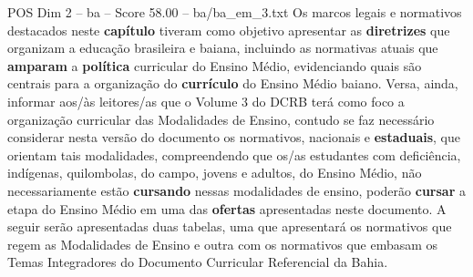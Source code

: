 \begin{textsample}{POS Dim 2 – ba – Score 58.00 – ba/ba\_em\_3.txt}
Os marcos legais e normativos destacados neste \textbf{capítulo} tiveram como objetivo apresentar as \textbf{diretrizes} que organizam a educação brasileira e baiana, incluindo as normativas atuais que \textbf{amparam} a \textbf{política} curricular do Ensino Médio, evidenciando quais são centrais para a organização do \textbf{currículo} do Ensino Médio baiano.
Versa, ainda, informar aos/às leitores/as que o Volume 3 do DCRB terá como foco a organização curricular das Modalidades de Ensino, contudo se faz necessário considerar nesta versão do documento os normativos, nacionais e \textbf{estaduais}, que orientam tais modalidades, compreendendo que os/as estudantes com deficiência, indígenas, quilombolas, do campo, jovens e adultos, do Ensino Médio, não necessariamente estão \textbf{cursando} nessas modalidades de ensino, poderão \textbf{cursar} a etapa do Ensino Médio em uma das \textbf{ofertas} apresentadas neste documento.
A seguir serão apresentadas duas tabelas, uma que apresentará os normativos que regem as Modalidades de Ensino e outra com os normativos que embasam os Temas Integradores do Documento Curricular Referencial da Bahia.

\end{textsample}
